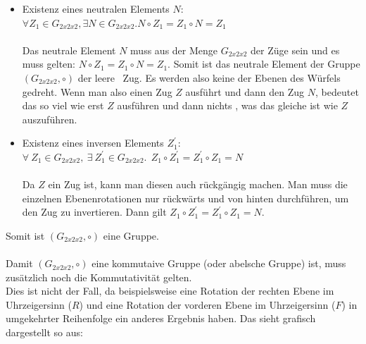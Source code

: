 \documentclass[12pt,a4paper, usenames, dvipsnames]{article}
\begin{document}
\begin{itemize}
\item Existenz eines neutralen Elements $N$:  \\
$\forall Z_1 \in G_{2x2x2}, \exists N \in G_{2x2x2}.N \circ Z_1 = Z_1 \circ N = Z_1$ \\
\\
Das neutrale Element $N$ muss aus der Menge $G_{2x2x2}$ der Züge sein und es muss gelten: $N \circ Z_1 = Z_1 \circ N = Z_1$. Somit ist das neutrale Element der Gruppe $(G_{2x2x2}, \circ)$ der \glqq leere \grqq \ Zug. Es werden also keine der Ebenen des Würfels gedreht. Wenn man also einen Zug $Z$ ausführt und dann den Zug $N$, bedeutet das so viel wie \glqq erst $Z$ ausführen und dann nichts \grqq , was das gleiche ist wie $Z$ auszuführen.


\item Existenz eines inversen Elements $Z_1^\prime$: \\ 
$\forall \  Z_1 \in G_{2x2x2},\ \exists \  Z_1^\prime \in G_{2x2x2}.  \ \ Z_1 \circ Z_1^\prime = Z_1^\prime \circ Z_1 = N$  \\
\\
Da $Z$ ein Zug ist, kann man diesen auch rückgängig machen. Man muss die einzelnen Ebenenrotationen nur rückwärts und von hinten durchführen, um den Zug zu invertieren. Dann gilt $Z_1 \circ Z_1^\prime = Z_1^\prime \circ Z_1 = N$.
\end{itemize}
Somit ist $(G_{2x2x2}, \circ)$ eine Gruppe. \\ 
\\
Damit $(G_{2x2x2}, \circ)$ eine kommutaive Gruppe (oder abelsche Gruppe) ist, muss zusätzlich noch die Kommutativität gelten. \\
Dies ist nicht der Fall, da beispielsweise eine Rotation der rechten Ebene im Uhrzeigersinn ($R$) und eine Rotation der vorderen Ebene im Uhrzeigersinn ($F$) in umgekehrter Reihenfolge ein anderes Ergebnis haben. Das sieht grafisch dargestellt so aus: \\
\end{document}
